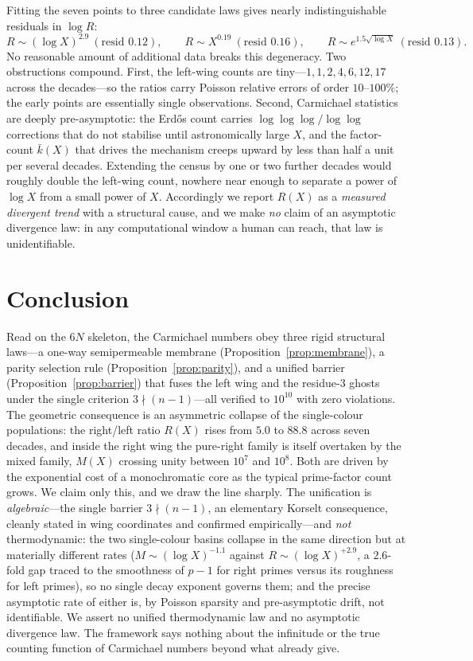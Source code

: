 \documentclass[11pt]{article}
\theoremstyle{plain}
\theoremstyle{definition}
\begin{document}
Fitting the seven points to three candidate laws gives nearly indistinguishable residuals in
$\log R$:
\[
R\sim(\log X)^{2.9}\ (\text{resid }0.12),\qquad
R\sim X^{0.19}\ (\text{resid }0.16),\qquad
R\sim e^{1.5\sqrt{\log X}}\ (\text{resid }0.13).
\]
No reasonable amount of additional data breaks this degeneracy. Two obstructions compound. First, the
left-wing counts are tiny---$1,1,2,4,6,12,17$ across the decades---so the ratios carry Poisson
relative errors of order $10\text{--}100\%$; the early points are essentially single observations.
Second, Carmichael statistics are deeply pre-asymptotic: the Erd\H{o}s count carries
$\log\log\log/\log\log$ corrections that do not stabilise until astronomically large $X$, and the
factor-count $\bar k(X)$ that drives the mechanism creeps upward by less than half a unit per several
decades. Extending the census by one or two further decades would roughly double the left-wing count,
nowhere near enough to separate a power of $\log X$ from a small power of $X$. Accordingly we report
$R(X)$ as a \emph{measured divergent trend} with a structural cause, and we make \emph{no} claim of an
asymptotic divergence law: in any computational window a human can reach, that law is unidentifiable.

\section{Conclusion}
Read on the $6N$ skeleton, the Carmichael numbers obey three rigid structural laws---a one-way
semipermeable membrane (Proposition~\ref{prop:membrane}), a parity selection rule
(Proposition~\ref{prop:parity}), and a unified barrier (Proposition~\ref{prop:barrier}) that fuses the
left wing and the residue-$3$ ghosts under the single criterion $3\nmid(n-1)$---all verified to
$10^{10}$ with zero violations. The geometric consequence is an asymmetric collapse of the single-colour
populations: the right/left ratio $R(X)$ rises from $5.0$ to $88.8$ across seven decades, and inside the
right wing the pure-right family is itself overtaken by the mixed family, $M(X)$ crossing unity between
$10^{7}$ and $10^{8}$. Both are driven by the exponential cost of a monochromatic core as the typical
prime-factor count grows. We claim only this, and we draw the line sharply. The unification is
\emph{algebraic}---the single barrier $3\nmid(n-1)$, an elementary Korselt consequence, cleanly stated in
wing coordinates and confirmed empirically---and \emph{not} thermodynamic: the two single-colour basins
collapse in the same direction but at materially different rates ($M\sim(\log X)^{-1.1}$ against
$R\sim(\log X)^{+2.9}$, a $2.6$-fold gap traced to the smoothness of $p-1$ for right primes versus its
roughness for left primes), so no single decay exponent governs them; and the precise asymptotic rate
of either is, by Poisson sparsity and pre-asymptotic drift, not identifiable. We assert no unified
thermodynamic law and no asymptotic divergence law. The framework says nothing about the infinitude or
the true counting function of Carmichael numbers beyond what \cite{AGP,Erdos,Pinch} already give.
\end{document}
